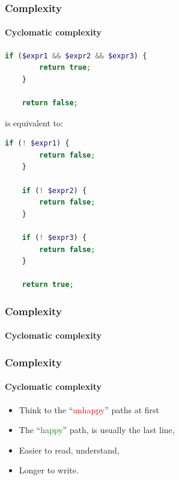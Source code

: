\begin{frame}[fragile,c]
    \frametitle{Complexity}
    \framesubtitle{Cyclomatic complexity}

    \begin{lstlisting}[language=php]
    if ($expr1 && $expr2 && $expr3) {
        return true;
    }

    return false;
    \end{lstlisting}

    \pause

    is equivalent to:

    \begin{lstlisting}[language=php]
    if (! $expr1) {
        return false;
    }

    if (! $expr2) {
        return false;
    }

    if (! $expr3) {
        return false;
    }

    return true;
    \end{lstlisting}
\end{frame}


\begin{frame}
    \frametitle{Complexity}
    \framesubtitle{Cyclomatic complexity}

    
\end{frame}

\begin{frame}
    \frametitle{Complexity}
    \framesubtitle{Cyclomatic complexity}

    \begin{itemize}[<+->]
        \item Think to the ``\textcolor{red}{unhappy}'' paths at first
        \item The ``\textcolor{green}{happy}'' path, is usually the last line,
        \item Easier to read, understand,
        \item Longer to write.
    \end{itemize}
\end{frame}

